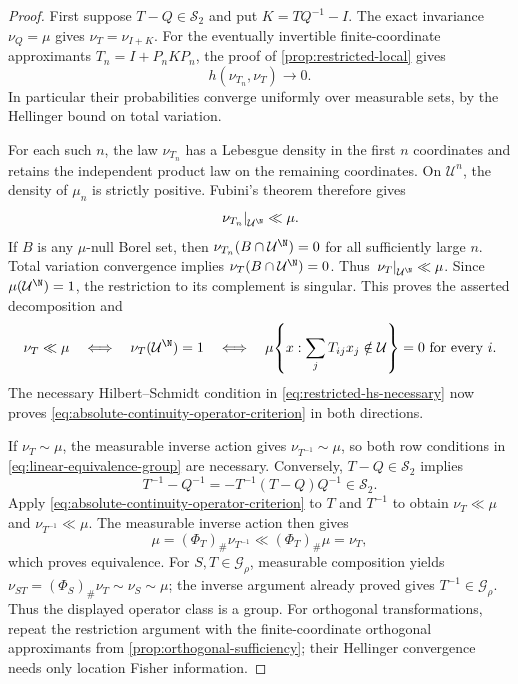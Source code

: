 \begin{proof}
First suppose $T-Q\in\mathcal S_2$ and put $K=TQ^{-1}-I$.
The exact invariance $\nu_Q=\mu$ gives $\nu_T=\nu_{I+K}$.
For the eventually invertible finite-coordinate approximants
$T_n=I+P_nKP_n$, the proof of \cref{prop:restricted-local} gives
\[
 h(\nu_{T_n},\nu_T)\longrightarrow0.
\]
In particular their probabilities converge uniformly over measurable
sets, by the Hellinger bound on total variation.

For each such $n$, the law $\nu_{T_n}$ has a Lebesgue density in the
first $n$ coordinates and retains the independent product law on the
remaining coordinates.  On $\mathcal U^n$, the density of $\mu_n$ is
strictly positive.  Fubini's theorem therefore gives
\[
 \left.\nu_{T_n}\right|_{\mathcal U^{\N}}\ll\mu.
\]
If $B$ is any $\mu$-null Borel set, then
$\nu_{T_n}(B\cap\mathcal U^{\N})=0$ for all sufficiently large $n$.
Total variation convergence implies
$\nu_T(B\cap\mathcal U^{\N})=0$.
Thus $\left.\nu_T\right|_{\mathcal U^{\N}}\ll\mu$.
Since $\mu(\mathcal U^{\N})=1$, the restriction to its complement is
singular.  This proves the asserted decomposition and
\[
 \nu_T\ll\mu
 \quad\Longleftrightarrow\quad
 \nu_T(\mathcal U^{\N})=1
 \quad\Longleftrightarrow\quad
 \mu\!\left\{x:\sum_jT_{ij}x_j\notin\mathcal U\right\}=0
       \text{ for every }i.
\]
The necessary Hilbert--Schmidt condition in
\eqref{eq:restricted-hs-necessary} now proves
\eqref{eq:absolute-continuity-operator-criterion} in both directions.

If $\nu_T\sim\mu$, the measurable inverse action gives
$\nu_{T^{-1}}\sim\mu$, so both row conditions in
\eqref{eq:linear-equivalence-group} are necessary.
Conversely, $T-Q\in\mathcal S_2$ implies
\[
 T^{-1}-Q^{-1}=-T^{-1}(T-Q)Q^{-1}\in\mathcal S_2.
\]
Apply \eqref{eq:absolute-continuity-operator-criterion} to $T$ and
$T^{-1}$ to obtain $\nu_T\ll\mu$ and $\nu_{T^{-1}}\ll\mu$.
The measurable inverse action then gives
\[
 \mu=(\Phi_T)_\#\nu_{T^{-1}}\ll(\Phi_T)_\#\mu=\nu_T,
\]
which proves equivalence.
For $S,T\in\mathcal G_\rho$, measurable composition yields
$\nu_{ST}=(\Phi_S)_\#\nu_T\sim\nu_S\sim\mu$; the inverse argument
already proved gives $T^{-1}\in\mathcal G_\rho$.
Thus the displayed operator class is a group.
For orthogonal transformations, repeat the restriction argument with
the finite-coordinate orthogonal approximants from
\cref{prop:orthogonal-sufficiency}; their Hellinger convergence needs
only location Fisher information.
\end{proof}

